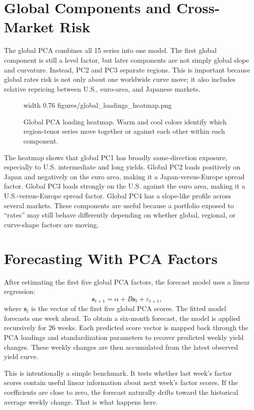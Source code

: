 \documentclass[11pt]{article}
\newcommand{\img}[2]{\pdfximage width #1 {#2}\pdfrefximage\pdflastximage}
\begin{document}
\section{Global Components and Cross-Market Risk}

The global PCA combines all 15 series into one model. The first global component is still a level factor, but later components are not simply global slope and curvature. Instead, PC2 and PC3 separate regions. This is important because global rates risk is not only about one worldwide curve move; it also includes relative repricing between U.S., euro-area, and Japanese markets.

\begin{figure}[htbp]
\centering
\img{0.76\linewidth}{figures/global_loadings_heatmap.png}
\caption{Global PCA loading heatmap. Warm and cool colors identify which region-tenor series move together or against each other within each component.}
\end{figure}

The heatmap shows that global PC1 has broadly same-direction exposure, especially to U.S. intermediate and long yields. Global PC2 loads positively on Japan and negatively on the euro area, making it a Japan-versus-Europe spread factor. Global PC3 loads strongly on the U.S. against the euro area, making it a U.S.-versus-Europe spread factor. Global PC4 has a slope-like profile across several markets. These components are useful because a portfolio exposed to ``rates'' may still behave differently depending on whether global, regional, or curve-shape factors are moving.

\section{Forecasting With PCA Factors}

After estimating the first five global PCA factors, the forecast model uses a linear regression:
\[
\mathbf{s}_{t+1}=\alpha+B\mathbf{s}_{t}+\varepsilon_{t+1},
\]
where $\mathbf{s}_t$ is the vector of the first five global PCA scores. The fitted model forecasts one week ahead. To obtain a six-month forecast, the model is applied recursively for 26 weeks. Each predicted score vector is mapped back through the PCA loadings and standardization parameters to recover predicted weekly yield changes. These weekly changes are then accumulated from the latest observed yield curve.

This is intentionally a simple benchmark. It tests whether last week's factor scores contain useful linear information about next week's factor scores. If the coefficients are close to zero, the forecast naturally drifts toward the historical average weekly change. That is what happens here.
\end{document}
